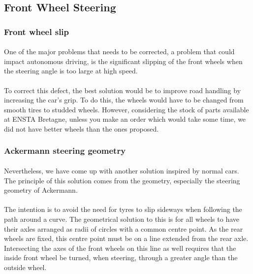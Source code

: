 \subsection{Front Wheel Steering}

\subsubsection{Front wheel slip}
\paragraph{}
One of the major problems that needs to be corrected, a problem that could impact
autonomous driving, is the significant slipping of the front wheels when the steering
angle is too large  at high speed.

\paragraph{}
To correct this defect, the best solution would be to improve road handling by
increasing the car's grip. To do this, the wheels would have to be changed from
smooth tires to studded wheels.
However, considering the stock of parts available at ENSTA Bretagne, unless you
make an order which would take some time, we did not have better wheels than the
ones proposed.

\subsubsection{Ackermann steering geometry}
\paragraph{}
Nevertheless, we have come up with another solution inspired by normal cars.
The principle of this solution comes from the geometry, especially the steering
geometry of Ackermann.

\paragraph{}
The intention is to avoid the need for tyres to slip sideways when following the
path around a curve. The geometrical solution to this is for all wheels to have
their axles arranged as radii of circles with a common centre point.  As the rear
wheels are fixed, this centre point must be on a line extended from the rear axle.
Intersecting the axes of the front wheels on this line as well requires that the
inside front wheel be turned, when steering, through a greater angle than the
outside wheel.

